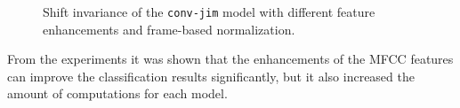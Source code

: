 \FloatBarrier
\noindent
\begin{figure}[!ht]
  \centering
  \caption{Shift invariance of the \texttt{conv-jim} model with different feature enhancements and frame-based normalization.}
  \label{fig:exp_fs_mfcc_tb_shift_conv-jim}
\end{figure}
\FloatBarrier
\noindent
From the experiments it was shown that the enhancements of the MFCC features can improve the classification results significantly, but it also increased the amount of computations for each model.